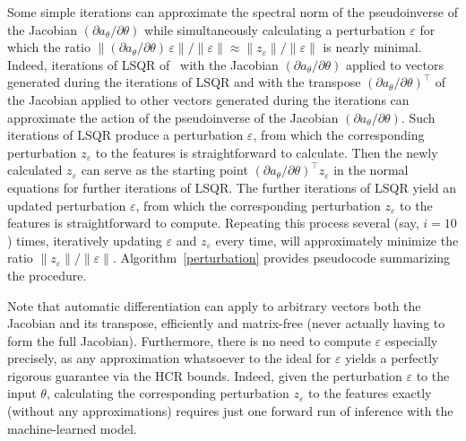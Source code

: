 \documentclass[]{fairmeta}
\renewcommand{\epsilon}{\varepsilon}
\begin{document}
Some simple iterations can approximate the spectral norm
of the pseudoinverse of the Jacobian $(\partial a_{\theta} / \partial \theta)$
while simultaneously calculating a perturbation $\epsilon$ for which the ratio
$\|(\partial a_{\theta} / \partial \theta) \, \epsilon\| / \|\epsilon\|
\approx \|z_{\epsilon}\| / \|\epsilon\|$ is nearly minimal.
Indeed, iterations of LSQR of~\cite{paige-saunders} with the Jacobian
$(\partial a_{\theta} / \partial \theta)$ applied to vectors generated
during the iterations of LSQR and with the transpose
$(\partial a_{\theta} / \partial \theta)^\top$ of the Jacobian
applied to other vectors generated during the iterations
can approximate the action of the pseudoinverse of the Jacobian
$(\partial a_{\theta} / \partial \theta)$.
Such iterations of LSQR produce a perturbation $\epsilon$,
from which the corresponding perturbation $z_{\epsilon}$ to the features
is straightforward to calculate.
Then the newly calculated $z_{\epsilon}$ can serve as the starting point
$(\partial a_{\theta} / \partial \theta)^\top z_{\epsilon}$
in the normal equations for further iterations of LSQR.
The further iterations of LSQR yield an updated perturbation $\epsilon$,
from which the corresponding perturbation $z_{\epsilon}$ to the features
is straightforward to compute. Repeating this process several
(say, $i = 10$) times, iteratively updating $\epsilon$ and $z_{\epsilon}$
every time, will approximately minimize the ratio
$\|z_{\epsilon}\| / \|\epsilon\|$.
Algorithm~\ref{perturbation} provides pseudocode summarizing the procedure.

Note that automatic differentiation can apply to arbitrary vectors
both the Jacobian and its transpose, efficiently and matrix-free
(never actually having to form the full Jacobian).
Furthermore, there is no need to compute $\epsilon$ especially precisely,
as any approximation whatsoever to the ideal for $\epsilon$ yields
a perfectly rigorous guarantee via the HCR bounds.
Indeed, given the perturbation $\epsilon$ to the input $\theta$,
calculating the corresponding perturbation $z_{\epsilon}$ to the features
exactly (without any approximations) requires just one forward run
of inference with the machine-learned model.
\end{document}

